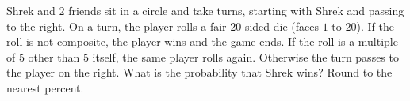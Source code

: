 Shrek and $2$ friends sit in a circle and take turns, starting with Shrek and passing to the right. On a turn, the player rolls a fair $20$-sided die (faces $1$ to $20$). If the roll is not composite, the player wins and the game ends. If the roll is a multiple of $5$ other than $5$ itself, the same player rolls again. Otherwise the turn passes to the player on the right. What is the probability that Shrek wins? Round to the nearest percent.

